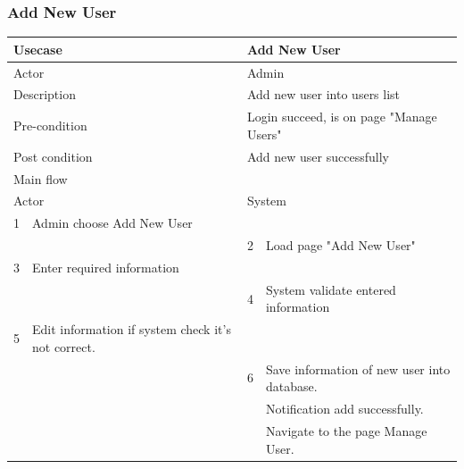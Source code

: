 \documentclass[a4paper]{article}
\begin{document}
\subsubsection{Add New User}
\begin{tabular}{|l|p{5cm}||l|p{5cm}|}
	\hline 
	\multicolumn{2}{|p{5cm}|}{Usecase} & \multicolumn{2}{|p{5cm}|}{Add New User}\\ 
	\hline 
	\multicolumn{2}{|p{5cm}|}{Actor} & \multicolumn{2}{|p{5cm}|}{Admin} \\ 
	\hline 
	\multicolumn{2}{|p{5cm}|}{Description} & \multicolumn{2}{|p{5cm}|}{Add new user into users list}\\
	\hline
	\multicolumn{2}{|p{5cm}|}{Pre-condition} & \multicolumn{2}{|p{5cm}|}{Login succeed, is on page "Manage Users"}\\
	\hline
	\multicolumn{2}{|p{5cm}|}{Post condition} & \multicolumn{2}{|p{5cm}|}{Add new user successfully} \\
	\hline
	\multicolumn{4}{|l|}{Main flow} \\
	\hline
	\multicolumn{2}{|p{5cm}|}{Actor} & \multicolumn{2}{|p{5cm}|}{System} \\
	\hline
	1 & Admin choose Add New User & & \\
	\hline
	& & 2 & Load page "Add New User" \\
	\hline 
	3 & Enter required information & & \\	
	\hline
	& & 4 &System validate entered information \\	
	\hline 
	5 & Edit information if system check it's not correct. & & \\	
	\hline
	& & 6 &Save information of new user into database.\\
	& &  &Notification add successfully.\\
	& & &Navigate to the page Manage User. \\	
	\hline 	
\end{tabular}
\end{document}
